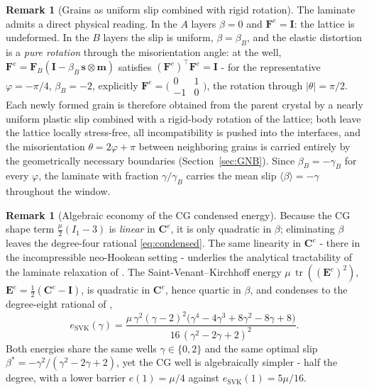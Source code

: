 \documentclass[12pt]{article}
\theoremstyle{plain}
\theoremstyle{definition}
\newtheorem{remark}[theorem]{Remark}
\newcommand{\bF}{\bm{F}}
\newcommand{\bC}{\bm{C}}
\newcommand{\bE}{\bm{E}}
\newcommand{\bs}{\bm{s}}
\newcommand{\bmm}{\bm{m}}
\newcommand{\bI}{\bm{I}}
\newcommand{\Fe}{\bF^{e}}
\newcommand{\Ce}{\bC^{e}}
\newcommand{\tr}{\operatorname{tr}}
\begin{document}
\begin{remark}[Grains as uniform slip combined with rigid rotation]\label{rem:grains}
The laminate admits a direct physical reading. In the $A$ layers
$\beta=0$ and $\Fe=\bI$: the lattice is undeformed. In the $B$ layers the
slip is uniform, $\beta=\beta_B$, and the elastic distortion is a
\emph{pure rotation} through the misorientation angle: at the well,
$\Fe=\bF_B(\bI-\beta_B\,\bs\otimes\bmm)$ satisfies
$(\Fe)^{\!\top}\Fe=\bI$ - for the representative $\varphi=-\pi/4$,
$\beta_B=-2$, explicitly
$\Fe=\bigl(\begin{smallmatrix}0&1\\-1&0\end{smallmatrix}\bigr)$, the
rotation through $|\theta|=\pi/2$. Each newly formed grain is therefore obtained
from the parent crystal by a nearly uniform plastic slip combined with a
rigid-body rotation of the lattice; both leave the lattice locally
stress-free, all incompatibility is pushed into the interfaces, and the
misorientation $\theta=2\varphi+\pi$ between neighboring grains is carried
entirely by the geometrically necessary boundaries (Section~\ref{sec:GNB}). Since $\beta_B=-\gamma_B$ for every $\varphi$, the laminate with fraction $\gamma/\gamma_B$ carries the mean slip $\langle \beta\rangle=-\gamma $ throughout the window.
\end{remark}

\begin{remark}[Algebraic economy of the CG condensed energy]\label{rem:degree}
Because the CG shape term $\tfrac{\mu}{2}(I_1-3)$ is \emph{linear} in $\Ce$, it
is only quadratic in $\beta$; eliminating $\beta$ leaves the degree-four rational
\eqref{eq:condensed}. The same linearity in $\Ce$ - there in the incompressible
neo-Hookean setting - underlies the analytical tractability of the laminate
relaxation of \citet{kochmann2011the}. The Saint-Venant--Kirchhoff energy
$\mu\,\tr((\bE^{e})^{2})$, $\bE^{e}=\tfrac12(\Ce-\bI)$, is quadratic in $\Ce$,
hence quartic in $\beta$, and condenses to the degree-eight rational of
\citet[Eq.~(31)]{koster2015aformation},
\[
  e_{\mathrm{SVK}}(\gamma)=\frac{\mu\,\gamma^{2}(\gamma-2)^{2}
  \bigl(\gamma^{4}-4\gamma^{3}+8\gamma^{2}-8\gamma+8\bigr)}
  {16\,(\gamma^{2}-2\gamma+2)^{2}} .
\]
Both energies share the same wells $\gamma\in\{0,2\}$ and the same optimal slip
$\beta^{\ast}=-\gamma^{2}/(\gamma^{2}-2\gamma+2)$, yet the CG well is
algebraically simpler - half the degree, with a lower barrier
$e(1)=\mu/4$ against $e_{\mathrm{SVK}}(1)=5\mu/16$. 
\end{remark}
\end{document}
